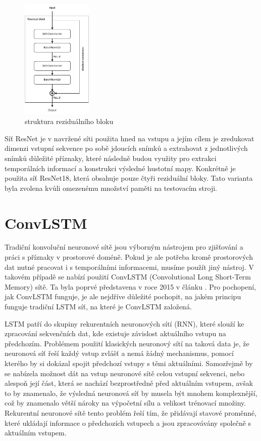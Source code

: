 \begin{figure}[h!]
	\centering
	\includegraphics[width=0.3\textwidth]{Figures/solution/residual_block.pdf}
	\caption{struktura reziduálního bloku}
	\label{fig:residual_block}
\end{figure}

Síť ResNet je v navržené síti použita hned na vstupu a jejím cílem je zredukovat dimenzi vstupní sekvence po sobě jdoucích snímků a extrahovat z jednotlivých snímků důležité příznaky, které následně budou využity pro extrakci temporálních informací a konstrukci výsledné hustotní mapy.
Konkrétně je použita síť ResNet18, která obsahuje pouze čtyři reziduální bloky.
Tato varianta byla zvolena kvůli omezenému množství paměti na testovacím stroji.

\section{ConvLSTM}
Tradiční konvoluční neuronové sítě jsou výborným nástrojem pro zjišťování a práci s příznaky v prostorové doméně. Pokud je ale potřeba kromě prostorových dat nutné pracovat i s temporálními informacemi, musíme použít jiný nástroj. V takovém případě se nabízí použití ConvLSTM (Convolutional Long Short-Term Memory) sítě. Ta byla poprvé představena v roce 2015 v článku \cite{ConvLSTM}. Pro pochopení, jak ConvLSTM funguje, je ale nejdříve důležité pochopit, na jakém principu funguje tradiční LSTM síť, na které je ConvLSTM založená.

LSTM patří do skupiny rekurentních neuronových sítí (RNN), které slouží ke zpracování sekvenčních dat, kde existuje závislost aktuálního vstupu na předchozím.
Problémem použití klasických neuronový sítí na taková data je, že neuronová síť řeší každý vstup zvlášť a nemá žádný mechanismus, pomocí kterého by si dokázal spojit předchozí vstupy s těmi aktuálními.
Samozřejmě by se nabízela možnost dát na vstup neuronové sítě celou vstupní sekvenci, nebo alespoň její část, která se nachází bezprostředně před aktuálním vstupem, avšak to by znamenalo, že výsledná neuronová síť by musela být mnohem komplexnější, což by znamenalo větší nároky na výpočetní sílu a velikost trénovací množiny.
Rekurentní neuronové sítě tento problém řeší tím, že přidávají stavové proměnné, které ukládají informace o předchozích vstupech a jsou zpracovávány společně s aktuálním vstupem.

